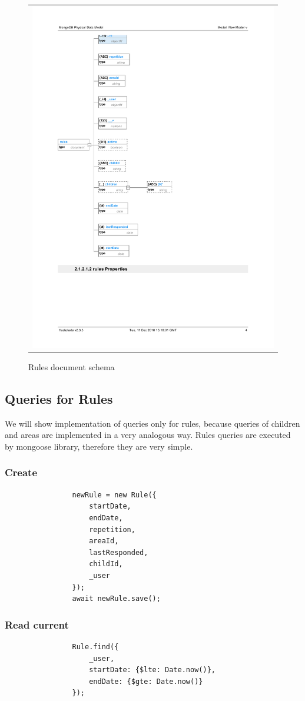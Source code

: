 \documentclass{sprawozdanie-agh}
\begin{document}
		\begin{figure}[H] 
			\centering
			\begin{tabular}{c}
				\includegraphics[width=.70\textwidth]{rulesDatabase} 
			\end{tabular} 
			\caption{Rules document schema}
		\end{figure}

	\subsection{Queries for Rules}

		We will show implementation of queries only for rules, because queries of children and areas are implemented in a very analogous way. Rules queries are executed by mongoose library, therefore they are very simple.

		\subsubsection{Create}
			\begin{lstlisting}
				newRule = new Rule({
					startDate,
					endDate,
					repetition,
					areaId,
					lastResponded,
					childId,
					_user
				});
				await newRule.save();
			\end{lstlisting}

		\subsubsection{Read current}
			\begin{lstlisting}
				Rule.find({
					_user,
					startDate: {$lte: Date.now()},
					endDate: {$gte: Date.now()}
				});
			\end{lstlisting}
\end{document}

